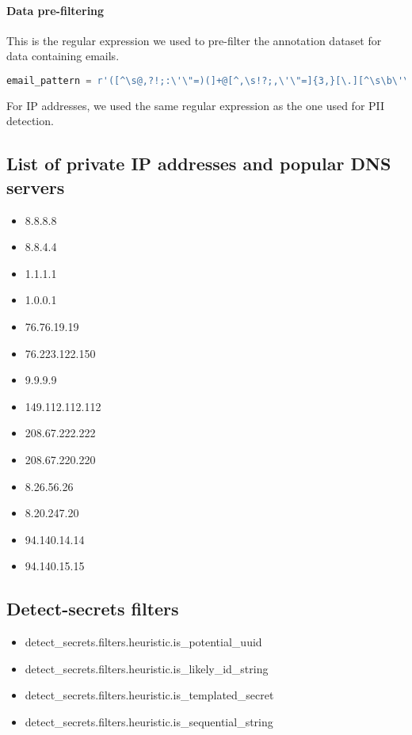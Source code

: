 \documentclass[10pt]{article} \usepackage{iclr2023_conference,times}
\begin{document}
\paragraph{Data pre-filtering}
This is the regular expression we used to pre-filter the annotation dataset for data containing emails.
\begin{lstlisting}[language=python] 
email_pattern = r'([^\s@,?!;:\'\"=)(]+@[^,\s!?;,\'\"=]{3,}[\.][^\s\b\'\"@,?!;:)(.]+)'
\end{lstlisting}
For IP addresses, we used the same regular expression as the one used for PII detection.


\subsection{List of private IP addresses and popular DNS servers}\label{sec:privateIPaddress}
\begin{itemize}
\item 8.8.8.8
\item 8.8.4.4
\item 1.1.1.1
\item 1.0.0.1
\item 76.76.19.19
\item 76.223.122.150
\item 9.9.9.9
\item 149.112.112.112
\item 208.67.222.222
\item 208.67.220.220
\item 8.26.56.26
\item 8.20.247.20
\item 94.140.14.14
\item 94.140.15.15
\end{itemize}

\subsection{Detect-secrets filters}\label{sec:detect-secrets-filters}
\begin{itemize}
\item detect\_secrets.filters.heuristic.is\_potential\_uuid
\item detect\_secrets.filters.heuristic.is\_likely\_id\_string
\item detect\_secrets.filters.heuristic.is\_templated\_secret
\item detect\_secrets.filters.heuristic.is\_sequential\_string
\end{itemize}
\end{document}
